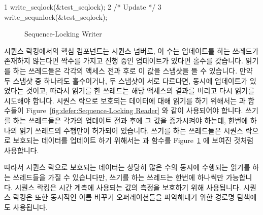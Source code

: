 { \scriptsize
\begin{verbbox}
  1 write_seqlock(&test_seqlock);
  2 /* Update */
  3 write_sequnlock(&test_seqlock);
\end{verbbox}
}
\begin{figure}[bp]
\centering
\theverbbox
\caption{Sequence-Locking Writer}
\label{fig:defer:Sequence-Locking Writer}
\end{figure}

시퀀스 락킹에서의 핵심 컴포넌트는 시퀀스 넘버로, 이 수는 업데이트를 하는
쓰레드가 존재하지 않는다면 짝수를 가지고 진행 중인 업데이트가 있다면 홀수를
갖습니다.
읽기를 하는 쓰레드들은 각각의 액세스 전과 후로 이 값을 스냅샷을 뜰 수 있습니다.
만약 두 스냅샷 중 하나라도 홀수이거나, 두 스냅샷이 서로 다르다면, 동시에
업데이트가 있었다는 것이고, 따라서 읽기를 한 쓰레드는 해당 액세스의 결과를
버리고 다시 읽기를 시도해야 합니다.
시퀀스 락으로 보호되는 데이터에 대해 읽기를 하기 위해서는 
과  함수들이 Figure~\ref{fig:defer:Sequence-Locking Reader}
와 같이 사용되어야 합니다.
쓰기를 하는 쓰레드들은 각가의 업데이트 전과 후에 그 값을 증가시켜야 하는데,
한번에 하나의 읽기 쓰레드의 수행만이 허가되어 있습니다.
쓰기를 하는 쓰레드들은 시퀀스 락으로 보호되는 데이터를 업데이트 하기 위해서는
 과  함수를
Figure~\ref{fig:defer:Sequence-Locking Writer} 에 보여진 것처럼 사용합니다.

따라서 시퀀스 락으로 보호되는 데이터는 상당히 많은 수의 동시에 수행되는 읽기를
하는 쓰레드들을 가질 수 있습니다만, 쓰기를 하는 쓰레드는 한번에 하나씩만
가능합니다.
시퀀스 락킹은 시간 계측에 사용되는 값의 측정을 보호하기 위해 사용됩니다.
시퀀스 락킹은 또한 동시적인 이름 바꾸기 오퍼레이션들을 파악해내기 위한 경로명
탐색에도 사용됩니다.
\iffalse

